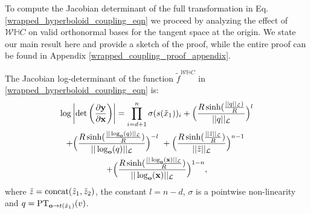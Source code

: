 To compute the Jacobian determinant of the full transformation in Eq. \ref{wrapped_hyperboloid_coupling_eqn} we proceed by analyzing the effect of $\mathcal{W}\mathbb{H}C$ on valid orthonormal bases for the tangent space at the origin. We state our main result here and provide a sketch of the proof, while the entire proof can be found in Appendix \ref{wrapped_coupling_proof_appendix}. 
\begin{prop}
The Jacobian log-determinant of the function $\tilde{f}^{\mathcal{W}\mathbb{H}C}$ in \eqref{wrapped_hyperboloid_coupling_eqn} is:
\begin{multline}
  \log \left|\textnormal{det}\left(\frac{\partial\mb{y}}{\partial \mb{x}}\right)\right| = \prod_{i=d+1}^n\sigma(s(\tilde{x}_1))_i + \Big(\frac{R \sinh(\frac{||q||_{\mathcal{L}})}{R}}{||q||_{\mathcal{L}}}\Big)^{l} \\
  + \Big(\frac{R\sinh(\frac{||\log_{\textbf{o}}(q)||_{\mathcal{L}}}{R})}{||\log_{\textbf{o}}(q)||_{\mathcal{L}}}\Big)^{-l} \ +  \Big(\frac{R\sinh(\frac{||\tilde{z}||_{\mathcal{L}}}{R})}{||\tilde{z}||_{\mathcal{L}}}\Big)^{n-1}
 \  \\ + \Big(\frac{R\sinh(\frac{||\log_{\textbf{o}}(\textbf{x})||_{\mathcal{L}}}{R})}{||\log_{\textbf{o}}(\textbf{x})||_{\mathcal{L}}}\Big)^{1-n},
\end{multline}
where $\tilde{z} = \textnormal{concat}(\tilde{z}_1, \tilde{z}_2)$, the constant $l = n-d$, $\sigma$ is a pointwise non-linearity 
and $q = \textnormal{PT}_{\textbf{o}\to t(\tilde{x}_1) }(v)$.
\end{prop}
